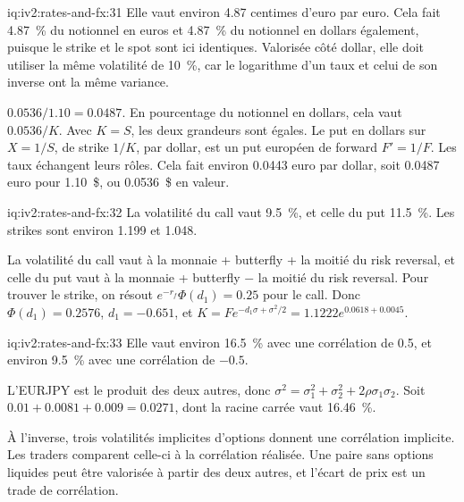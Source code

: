 \begin{solution}{iq:iv2:rates-and-fx:31}
Elle vaut environ 4.87 centimes d'euro par euro. Cela fait 4.87~\% du notionnel en euros et 4.87~\% du notionnel en dollars également, puisque le strike et le spot sont ici identiques. Valorisée côté dollar, elle doit utiliser la même volatilité de 10~\%, car le logarithme d'un taux et celui de son inverse ont la même variance.

$0.0536/1.10 = 0.0487$. En pourcentage du notionnel en dollars, cela vaut $0.0536/K$. Avec $K = S$, les deux grandeurs sont égales. Le put en dollars sur $X = 1/S$, de strike $1/K$, par dollar, est un put européen de forward $F' = 1/F$. Les taux échangent leurs rôles. Cela fait environ 0.0443 euro par dollar, soit 0.0487 euro pour 1.10~\$, ou 0.0536~\$ en valeur.

\end{solution}

\begin{solution}{iq:iv2:rates-and-fx:32}
La volatilité du call vaut 9.5~\%, et celle du put 11.5~\%. Les strikes sont environ 1.199 et 1.048.

La volatilité du call vaut à la monnaie + butterfly + la moitié du risk reversal, et celle du put vaut à la monnaie + butterfly $-$ la moitié du risk reversal. Pour trouver le strike, on résout $e^{-r_f}\Phi(d_1) = 0.25$ pour le call. Donc $\Phi(d_1) = 0.2576$, $d_1 = -0.651$, et $K = Fe^{-d_1\sigma + \sigma^2/2} = 1.1222e^{0.0618 + 0.0045}$.

\end{solution}

\begin{solution}{iq:iv2:rates-and-fx:33}
Elle vaut environ 16.5~\% avec une corrélation de 0.5, et environ 9.5~\% avec une corrélation de $-0.5$.

L'EURJPY est le produit des deux autres, donc $\sigma^2 = \sigma_1^2 + \sigma_2^2 + 2\rho\sigma_1\sigma_2$. Soit $0.01 + 0.0081 + 0.009 = 0.0271$, dont la racine carrée vaut 16.46~\%.

À l'inverse, trois volatilités implicites d'options donnent une corrélation implicite. Les traders comparent celle-ci à la corrélation réalisée. Une paire sans options liquides peut être valorisée à partir des deux autres, et l'écart de prix est un trade de corrélation.

\end{solution}

